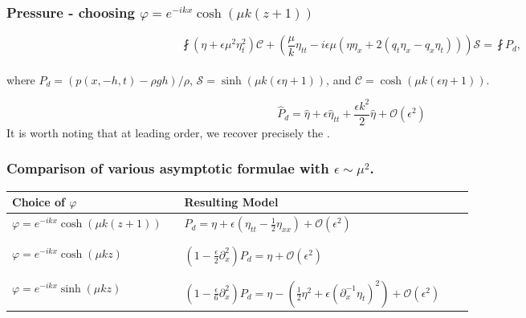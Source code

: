 \begin{frame}[t]\frametitle{Pressure - choosing \(\varphi =e^{-ikx}\cosh(\mu k(z+1))\)}

    \[\displaystyle\fint{\left(\eta+\epsilon\mu^2\eta_t^2\right)\mathcal{C} + \left(\frac{\mu}{k}\eta_{tt}-i\epsilon\mu\left(\eta\eta_x + 2\left(q_t\eta_x-q_x\eta_t\right)\right)\right)\mathcal{S}}=\fint{P_d},\] 
    ~\\
    where \(P_d = (p(x,-h,t)-\rho g h)/\rho\), \(\mathcal{S} = \sinh(\mu k (\epsilon\eta+1))\), and \(\mathcal{C} = \cosh(\mu k (\epsilon\eta+1))\).
    \vfill

    \pause
        \[\hat{P}_{d} =\hat{\eta}+ \epsilon\hat{\eta}_{tt} + \frac{\epsilon k^2}{2}\hat{\eta} + \mathcal{O}(\epsilon^2)\]
    \pause
    It is worth noting that at leading order, we recover precisely the .  \pause {}
\end{frame}


\begin{frame}[t]
	\frametitle{Comparison of various asymptotic formulae with \(\epsilon \sim\mu^2\).}
	\vfill
    \begin{table}[htp]
        \centering
        {\begin{tabular}{p{}p{}p{}r>{\raggedleft}p{}}\toprule
            Choice of \(\varphi\) && Resulting Model &\\
            \hline
            \(\displaystyle \varphi = e^{-ikx}\cosh(\mu k (z + 1))\) && \(\displaystyle P_d = \eta + \epsilon\left(\eta_{tt} -\frac{1}{2}\eta_{xx}\right) + \mathcal{O}(\epsilon^2)\)&\\
            &&&\\ &&&\\
            \(\displaystyle \varphi = e^{-ikx}\cosh(\mu kz)\) && \(\displaystyle \left(1 - \frac{\epsilon}{2}\partial_x^2\right)P_d = \eta + \mathcal{O}(\epsilon^2)\)&\\ && \\ &&&\\
            \(\displaystyle \varphi = e^{-ikx}\sinh(\mu kz)\) && \(\displaystyle \left(1 - \frac{\epsilon}{6}\partial_x^2\right)P_d = \eta - \left(\frac{1}{2}\eta^2 + \epsilon\left(\partial_x^{-1}\eta_t\right)^2\right) + \mathcal{O}(\epsilon^2)\)&\\\bottomrule
        \end{tabular}}
    \end{table}
\end{frame}

